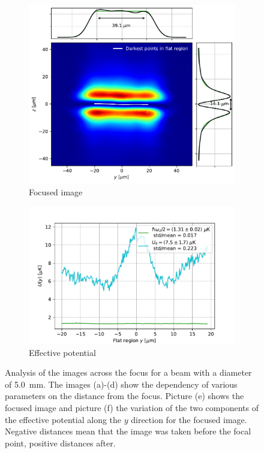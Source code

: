 \begin{figure}
    \begin{subfigure}{0.5\textwidth}
        \includegraphics[width=\textwidth]{chapters/chapter_3/figures/focused_anal.pdf}
        \caption{Focused image}
        \label{fig:focus_image}
    \end{subfigure}
    \begin{subfigure}{0.5\textwidth}
        \includegraphics[width=\textwidth]{chapters/chapter_3/figures/omega_U_5focus.pdf}
        \caption{Effective potential}
        \label{fig:focus_U_omega}
    \end{subfigure}
    \caption{Analysis of the images across the focus for a beam with a diameter of \SI{5.0}{mm}. The images (a)-(d) show the dependency of various parameters on the distance from the focus. Picture (e) shows the focused image and picture (f) the variation of the two components of the effective potential along the $y$ direction for the focused image. Negative distances mean that the image was taken before the focal point, positive distances after.}
    \label{fig:analysis_focus}
\end{figure}

